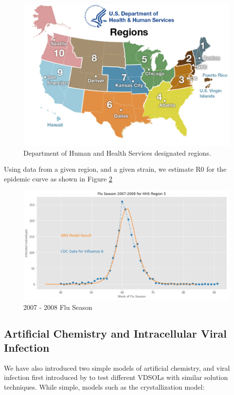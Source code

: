 \documentclass[11pt]{article}
\begin{document}
\begin{figure}
\includegraphics[width=\textwidth]{figs/regionsmap.pdf}
\caption{Department of Human and Health Services designated regions.}
\label{Fig:Regions}
\end{figure}

Using data from a given region, and a given strain, we estimate R0 for the epidemic curve as shown in Figure \ref{Fig:R0}

\begin{figure}
\includegraphics[width=\textwidth]{figs/2007-2008-SIRS.pdf}
\caption{2007 - 2008 Flu Season}
\label{Fig:R0}
\end{figure}

\subsection{Artificial Chemistry and Intracellular Viral Infection}

We have also introduced two simple models of artificial chemistry, and viral infection first introduced by \cite{srivastava2002stochastic,haseltine2002approximate} to test different VDSOLs with similar solution techniques.  While simple, models such as the crystallization model:
\end{document}
